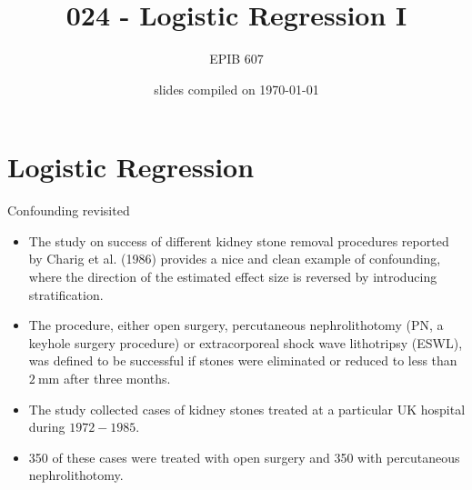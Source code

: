 \documentclass[10pt]{beamer}\usepackage[]{graphicx}\usepackage[]{color}
\begin{document}
	
	
	


	
	\title{024 - Logistic Regression I}
	\author{EPIB 607}
	
	\date{slides compiled on \today}
	
	\maketitle
	
	


\section{Logistic Regression}

\begin{frame}{Confounding revisited}

\begin{itemize}
	\item The study on success of different kidney stone removal procedures reported by Charig et al. (1986) provides a nice and clean example of confounding, where the direction of the estimated effect size is reversed by introducing stratification.
\item The procedure, either open surgery, percutaneous nephrolithotomy (PN, a keyhole surgery procedure) or extracorporeal shock wave lithotripsy (ESWL), was defined to be successful if stones were eliminated or reduced to less than $2 \mathrm{~mm}$ after three months.
\item The study collected cases of kidney stones treated at a particular UK hospital during $1972-1985$.
\item 350 of these cases were treated with open surgery and 350 with percutaneous nephrolithotomy.
\end{itemize}
\end{frame}
\end{document}
